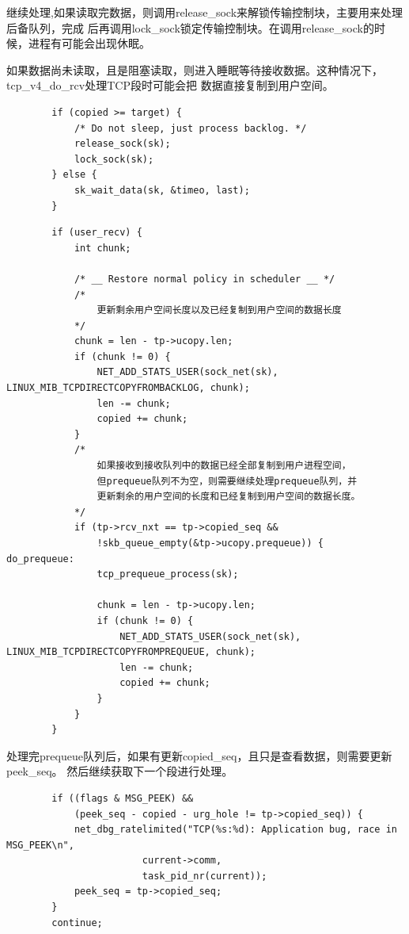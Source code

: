     继续处理,如果读取完数据，则调用release\_sock来解锁传输控制块，主要用来处理后备队列，完成
    后再调用lock\_sock锁定传输控制块。在调用release\_sock的时候，进程有可能会出现休眠。

    如果数据尚未读取，且是阻塞读取，则进入睡眠等待接收数据。这种情况下，tcp\_v4\_do\_rcv处理TCP段时可能会把
    数据直接复制到用户空间。
\begin{verbatim}
        if (copied >= target) {
            /* Do not sleep, just process backlog. */
            release_sock(sk);
            lock_sock(sk);
        } else {
            sk_wait_data(sk, &timeo, last);
        }
\end{verbatim}

\begin{verbatim}
        if (user_recv) {
            int chunk;

            /* __ Restore normal policy in scheduler __ */
            /*
                更新剩余用户空间长度以及已经复制到用户空间的数据长度
            */
            chunk = len - tp->ucopy.len;
            if (chunk != 0) {
                NET_ADD_STATS_USER(sock_net(sk), LINUX_MIB_TCPDIRECTCOPYFROMBACKLOG, chunk);
                len -= chunk;
                copied += chunk;
            }
            /*
                如果接收到接收队列中的数据已经全部复制到用户进程空间，
                但prequeue队列不为空，则需要继续处理prequeue队列，并
                更新剩余的用户空间的长度和已经复制到用户空间的数据长度。                
            */
            if (tp->rcv_nxt == tp->copied_seq &&
                !skb_queue_empty(&tp->ucopy.prequeue)) {
do_prequeue:
                tcp_prequeue_process(sk);

                chunk = len - tp->ucopy.len;
                if (chunk != 0) {
                    NET_ADD_STATS_USER(sock_net(sk), LINUX_MIB_TCPDIRECTCOPYFROMPREQUEUE, chunk);
                    len -= chunk;
                    copied += chunk;
                }
            }
        }
\end{verbatim}
        处理完prequeue队列后，如果有更新copied\_seq，且只是查看数据，则需要更新peek\_seq。
        然后继续获取下一个段进行处理。
\begin{verbatim}
        if ((flags & MSG_PEEK) &&
            (peek_seq - copied - urg_hole != tp->copied_seq)) {
            net_dbg_ratelimited("TCP(%s:%d): Application bug, race in MSG_PEEK\n",
                        current->comm,
                        task_pid_nr(current));
            peek_seq = tp->copied_seq;
        }
        continue;
\end{verbatim}
        
